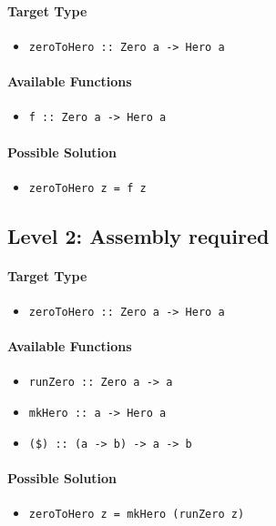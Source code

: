 \documentclass[preprint,12pt]{elsarticle}
\begin{document}
\paragraph{Target Type } 
\begin{itemize}
    \item \texttt{zeroToHero :: Zero a -> Hero a}
\end{itemize}

\paragraph{Available Functions} 
\begin{itemize}
    \item \texttt{f :: Zero a -> Hero a}
\end{itemize}

\paragraph{Possible Solution} 
\begin{itemize}
    \item \texttt{zeroToHero z = f z}
\end{itemize}


\subsection{Level 2: Assembly required}

\paragraph{Target Type} 
\begin{itemize}
    \item \texttt{zeroToHero :: Zero a -> Hero a}
\end{itemize}

\paragraph{Available Functions} 
\begin{itemize}
    \item \texttt{runZero :: Zero a -> a}
    \item \texttt{mkHero :: a -> Hero a}
    \item \texttt{(\$) :: (a -> b) -> a -> b}
\end{itemize}

\paragraph{Possible Solution} 
\begin{itemize}
    \item \texttt{zeroToHero z = mkHero (runZero z)}
\end{itemize}
\end{document}
